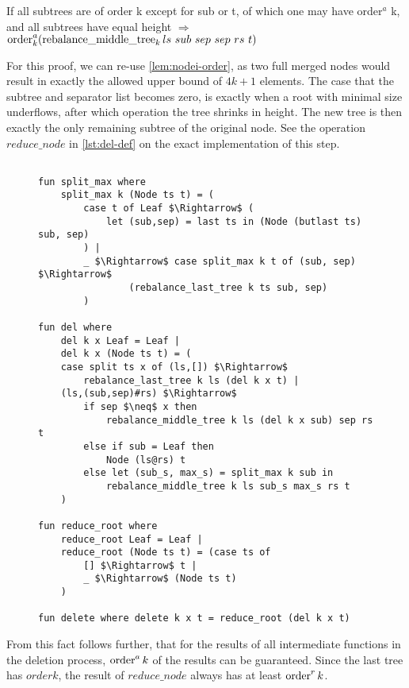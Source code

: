 \begin{lemma}
    If all subtrees are of order k except for sub or t, of which one may have order$^a$ k,
    and all subtrees have equal height $\Longrightarrow$
    $\order^a_k (\rebalancemt_k ls\ sub\ sep\ sep\ rs\ t)$
\end{lemma}

For this proof, we can re-use \autoref{lem:nodei-order},
as two full merged nodes would result in exactly the allowed
upper bound of $4k+1$ elements.
The case that the subtree and separator list becomes zero,
is exactly when a root with minimal size underflows,
after which operation the tree shrinks in height.
The new tree is then exactly the only remaining subtree of the original node.
See the operation $reduce\_node$ in \autoref{lst:del-def} on the exact implementation
of this step.

\begin{figure}
\begin{lstlisting}[mathescape=true, language=Isabelle,label={lst:del-def},
    caption={The $delete$ function}]

fun split_max where
    split_max k (Node ts t) = (
        case t of Leaf $\Rightarrow$ (
            let (sub,sep) = last ts in (Node (butlast ts) sub, sep)
        ) |
        _ $\Rightarrow$ case split_max k t of (sub, sep) $\Rightarrow$
                (rebalance_last_tree k ts sub, sep)
        )

fun del where
    del k x Leaf = Leaf |
    del k x (Node ts t) = (
    case split ts x of (ls,[]) $\Rightarrow$
        rebalance_last_tree k ls (del k x t) |
    (ls,(sub,sep)#rs) $\Rightarrow$
        if sep $\neq$ x then
            rebalance_middle_tree k ls (del k x sub) sep rs t
        else if sub = Leaf then
            Node (ls@rs) t
        else let (sub_s, max_s) = split_max k sub in
            rebalance_middle_tree k ls sub_s max_s rs t
    )
 
fun reduce_root where
    reduce_root Leaf = Leaf |
    reduce_root (Node ts t) = (case ts of
        [] $\Rightarrow$ t |
        _ $\Rightarrow$ (Node ts t)
    )
 
fun delete where delete k x t = reduce_root (del k x t)
\end{lstlisting}
\end{figure}

From this fact follows further, that for the results of all intermediate functions
in the deletion process, $\operatorname{order}^a k$ of the results can be guaranteed.
Since the last tree has $order k$, the result of $reduce\_node$ always has at least $\operatorname{order}^r k$.

